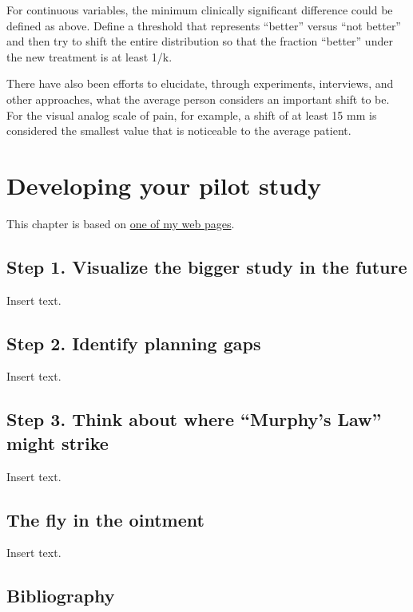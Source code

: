 \documentclass[
  letterpaper,
  DIV=11,
  numbers=noendperiod]{scrreprt}
\begin{document}
For continuous variables, the minimum clinically significant difference
could be defined as above. Define a threshold that represents ``better''
versus ``not better'' and then try to shift the entire distribution so
that the fraction ``better'' under the new treatment is at least 1/k.

There have also been efforts to elucidate, through experiments,
interviews, and other approaches, what the average person considers an
important shift to be. For the visual analog scale of pain, for example,
a shift of at least 15 mm is considered the smallest value that is
noticeable to the average patient.


\chapter{Developing your pilot study}\label{developing-your-pilot-study}

This chapter is based on \href{http://blog.pmean.com/pilot-study/}{one
of my web pages}.

\section{Step 1. Visualize the bigger study in the
future}\label{step-1.-visualize-the-bigger-study-in-the-future}

Insert text.

\section{Step 2. Identify planning
gaps}\label{step-2.-identify-planning-gaps}

Insert text.

\section{Step 3. Think about where ``Murphy's Law'' might
strike}\label{step-3.-think-about-where-murphys-law-might-strike}

Insert text.

\section{The fly in the ointment}\label{the-fly-in-the-ointment-2}

Insert text.

\section{Bibliography}\label{bibliography-2}
\end{document}
